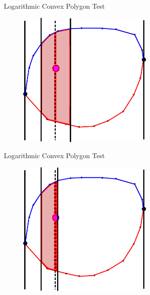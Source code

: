 \documentclass{beamer}
\begin{document}
\begin{frame}{Logarithmic Convex Polygon Test}

\begin{figure}[t]
	\centering
	\includegraphics[width=0.6\textwidth]{ConvexPolygonCastLines2.pdf}
\end{figure}

\end{frame}


\begin{frame}{Logarithmic Convex Polygon Test}

\begin{figure}[t]
	\centering
	\includegraphics[width=0.6\textwidth]{ConvexPolygonCastLines3.pdf}
\end{figure}

\end{frame}
\end{document}
